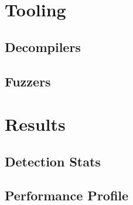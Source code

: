 
\part{Tooling} \label{sec:evasion}
\chapter{Decompilers} \label{ch:decompilers}

\chapter{Fuzzers} \label{ch:fuzzers}



\part{Results}
\chapter{Detection Stats} \label{ch:stats}

\chapter{Performance Profile} \label{ch:profiling}


